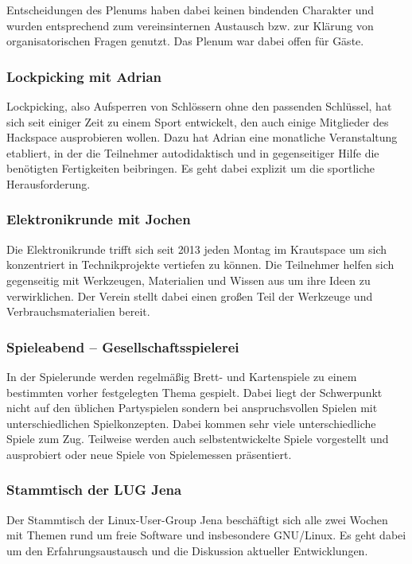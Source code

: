 \documentclass[10pt,DIV16]{scrartcl}
\begin{document}
Entscheidungen des Plenums haben dabei keinen bindenden Charakter
und wurden entsprechend zum vereinsinternen Austausch bzw. zur
Klärung von organisatorischen Fragen genutzt. Das Plenum war dabei
offen für Gäste.

\subsubsection{Lockpicking mit Adrian}

Lockpicking, also Aufsperren von Schlössern ohne den passenden Schlüssel, 
hat sich seit einiger Zeit zu einem Sport entwickelt, den auch einige 
Mitglieder des Hackspace ausprobieren wollen. Dazu hat Adrian eine monatliche 
Veranstaltung etabliert, in der die Teilnehmer autodidaktisch und in 
gegenseitiger Hilfe die benötigten Fertigkeiten beibringen. Es geht dabei 
explizit um die sportliche Herausforderung. 

\subsubsection{Elektronikrunde mit Jochen}

Die Elektronikrunde trifft sich seit 2013 jeden Montag im Krautspace um sich 
konzentriert in Technikprojekte vertiefen zu können. Die Teilnehmer helfen 
sich gegenseitig mit Werkzeugen, Materialien und Wissen aus um ihre Ideen zu 
verwirklichen. Der Verein stellt dabei einen großen Teil der Werkzeuge und 
Verbrauchsmaterialien bereit. 

\subsubsection{Spieleabend -- Gesellschaftsspielerei}

In der Spielerunde werden regelmäßig Brett- und Kartenspiele zu einem 
bestimmten vorher festgelegten Thema gespielt. Dabei liegt der Schwerpunkt 
nicht auf den üblichen Partyspielen sondern bei anspruchsvollen Spielen mit 
unterschiedlichen Spielkonzepten. Dabei kommen sehr viele unterschiedliche 
Spiele zum Zug. Teilweise werden auch selbstentwickelte Spiele vorgestellt 
und ausprobiert oder neue Spiele von Spielemessen präsentiert. 

\subsubsection{Stammtisch der LUG Jena}

Der Stammtisch der Linux-User-Group Jena beschäftigt sich alle zwei Wochen 
mit Themen rund um freie Software und insbesondere GNU/Linux. Es geht dabei 
um den Erfahrungsaustausch und die Diskussion aktueller Entwicklungen. 
\end{document}
